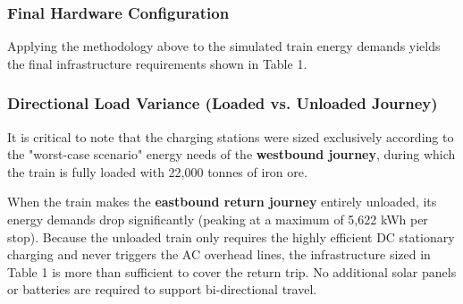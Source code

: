 \subsubsection*{Final Hardware Configuration}
Applying the methodology above to the simulated train energy demands yields the final infrastructure requirements shown in Table 1. 

\begin{table}[h!]
\centering
\caption{Final Master Sizing Configuration (Efficiency-Adjusted)}
\vspace{0.5em}
\label{MasterEnergyTable}
\renewcommand{\arraystretch}{1.3}
\end{table}

\subsubsection*{Directional Load Variance (Loaded vs. Unloaded Journey)}
It is critical to note that the charging stations were sized exclusively according to the "worst-case scenario" energy needs of the \textbf{westbound journey}, during which the train is fully loaded with 22,000 tonnes of iron ore. 

When the train makes the \textbf{eastbound return journey} entirely unloaded, its energy demands drop significantly (peaking at a maximum of 5,622 kWh per stop). Because the unloaded train only requires the highly efficient DC stationary charging and never triggers the AC overhead lines, the infrastructure sized in Table 1 is more than sufficient to cover the return trip. No additional solar panels or batteries are required to support bi-directional travel.

